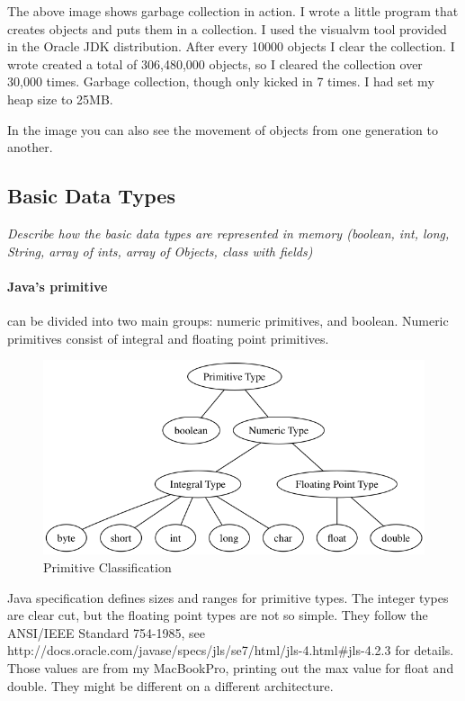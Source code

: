 \documentclass[fleqn,10pt]{SelfArx} %
\begin{document}
The above image shows garbage collection in action. I wrote a little program that creates objects and puts them in a collection. I used the visualvm tool provided in the Oracle JDK distribution\cite{garbagecollection}. After every 10000 objects I clear the collection. I wrote created a total of 306,480,000 objects, so I cleared the collection over 30,000 times. Garbage collection, though only kicked in 7 times. I had set my heap size to 25MB. 

In the image you can also see the movement of objects from one generation to another.


\subsection{Basic Data Types}
\textit{Describe how the basic data types are represented in memory (boolean, int, long, String, array of ints, array of Objects, class with fields)}
\paragraph{Java's primitive} can be divided into two main groups: numeric primitives, and boolean. Numeric primitives consist of integral and floating point primitives.\cite{gosling}

\begin{figure}[ht]\centering
\includegraphics[width=\linewidth]{primitives}
\caption{Primitive Classification}
\label{fig:results}
\end{figure}

Java specification\cite{gosling} defines sizes and ranges for primitive types. The integer types are clear cut, but the floating point types are not so simple. They follow the ANSI/IEEE Standard 754-1985, see http://docs.oracle.com/javase/specs/jls/se7/html/jls-4.html\#jls-4.2.3 for details. Those values are from my MacBookPro, printing out the max value for float and double. They might be different on a different architecture.
\end{document}
